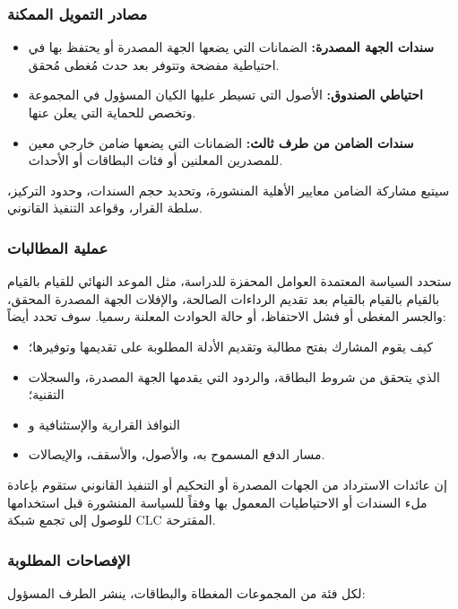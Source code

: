 \documentclass[11pt]{article}
\begin{document}
\subsubsection*{مصادر التمويل الممكنة}

\begin{itemize}[leftmargin=*]
\item \textbf{سندات الجهة المصدرة:} الضمانات التي يضعها الجهة المصدرة أو يحتفظ بها في احتياطية مفضحة وتتوفر بعد حدث مُغطى مُحقق.
\item \textbf{احتياطي الصندوق:} الأصول التي تسيطر عليها الكيان المسؤول في المجموعة وتخصص للحماية التي يعلن عنها.
\item \textbf{سندات الضامن من طرف ثالث:} الضمانات التي يضعها ضامن خارجي معين للمصدرين المعلنين أو فئات البطاقات أو الأحداث.
\end{itemize}
سيتبع مشاركة الضامن معايير الأهلية المنشورة، وتحديد حجم السندات، وحدود التركيز، سلطة القرار، وقواعد التنفيذ القانوني.

\subsubsection*{عملية المطالبات}

ستحدد السياسة المعتمدة العوامل المحفزة للدراسة، مثل الموعد النهائي للقيام بالقيام بالقيام بالقيام بالقيام بعد تقديم الرداءات الصالحة، والإفلات الجهة المصدرة المحقق، والجسر المغطى أو فشل الاحتفاظ، أو حالة الحوادث المعلنة رسميا. سوف تحدد أيضاً:

\begin{itemize}[leftmargin=*]
\item كيف يقوم المشارك بفتح مطالبة وتقديم الأدلة المطلوبة على تقديمها وتوفيرها؛
\item الذي يتحقق من شروط البطاقة، والردود التي يقدمها الجهة المصدرة، والسجلات التقنية؛
\item النوافذ القرارية والإستئنافية و
\item مسار الدفع المسموح به، والأصول، والأسقف، والإيصالات.
\end{itemize}
إن عائدات الاسترداد من الجهات المصدرة أو التحكيم أو التنفيذ القانوني ستقوم بإعادة ملء السندات أو الاحتياطيات المعمول بها وفقاً للسياسة المنشورة قبل استخدامها للوصول إلى تجمع شبكة CLC المقترحة.

\subsubsection*{الإفصاحات المطلوبة}

لكل فئة من المجموعات المغطاة والبطاقات، ينشر الطرف المسؤول:
\end{document}
